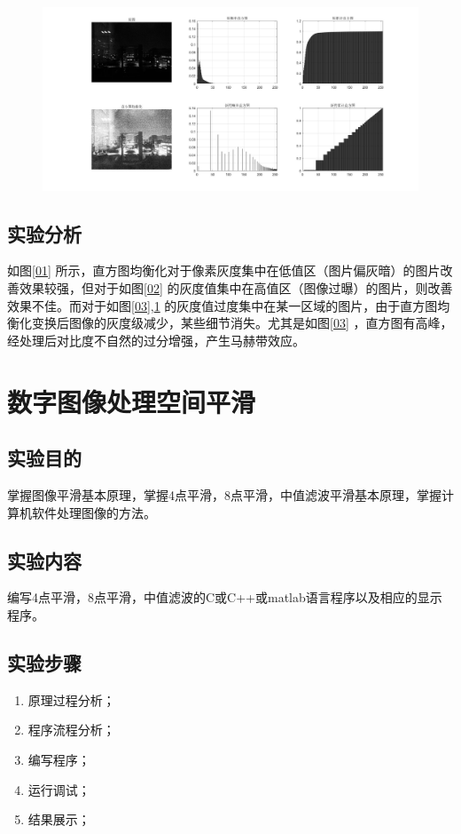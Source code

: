 \documentclass[12pt]{article}
\begin{document}
\begin{figure}[htbp]
  \centering
  \includegraphics[width=\textwidth]{picture/04}
  \caption{}\label{04}
\end{figure}
\subsection{实验分析}
如图\ref{01}
所示，直方图均衡化对于像素灰度集中在低值区（图片偏灰暗）的图片改善效果较强，但对于如图\ref{02}
的灰度值集中在高值区（图像过曝）的图片，则改善效果不佳。而对于如图\ref{03},\ref{04}
的灰度值过度集中在某一区域的图片，由于直方图均衡化变换后图像的灰度级减少，某些细节消失。尤其是如图\ref{03}
，直方图有高峰，经处理后对比度不自然的过分增强，产生马赫带效应。
\newpage
\section{数字图像处理空间平滑}
\setcounter{equation}{0}
\setcounter{table}{0}
\setcounter{figure}{0}
\subsection{实验目的}
掌握图像平滑基本原理，掌握4点平滑，8点平滑，中值滤波平滑基本原理，掌握计算机软件处理图像的方法。
\subsection{实验内容}
编写4点平滑，8点平滑，中值滤波的C或C++或matlab语言程序以及相应的显示程序。
\subsection{实验步骤}
\begin{enumerate}
  \item 原理过程分析；
\item 程序流程分析；
\item 编写程序；
\item 运行调试；
\item 结果展示；
\end{enumerate}
\end{document}
